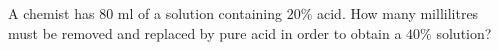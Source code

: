 A chemist has $80$ ml of a solution containing $20\%$ acid. How many millilitres must be removed and replaced by pure acid in order to obtain a $40\%$ solution?

